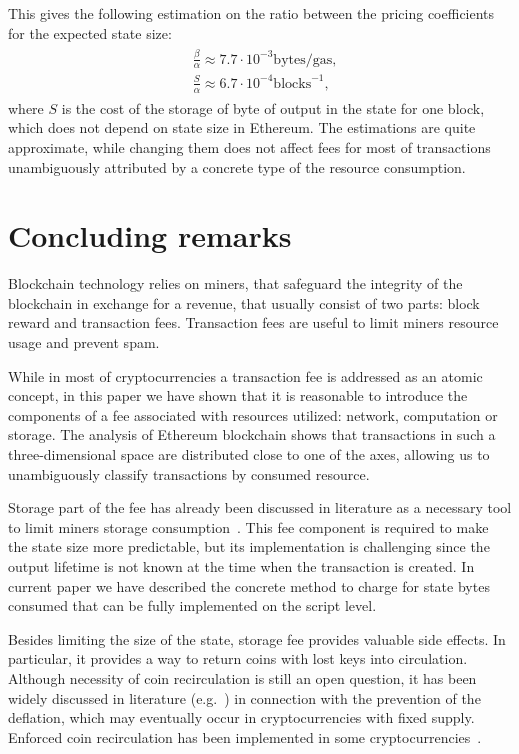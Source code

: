 \documentclass[]{llncs}   %
\begin{document}
This gives the following estimation on the ratio between the pricing coefficients for the expected state size:
\begin{align}
\begin{split}
    &\frac{\beta}{\alpha} \approx 7.7\cdot10^{-3} \mathrm{bytes}/\mathrm{gas},\\
    &\frac{S}{\alpha} \approx 6.7\cdot10^{-4} \mathrm{blocks}^{-1},
\end{split}
\end{align}
where $S$ is the cost of the storage of byte of output in the state for one block, which does
not depend on state size in Ethereum. The estimations are quite approximate, while changing
them does not affect fees for most of transactions unambiguously attributed by a concrete type of the resource consumption.

\section{Concluding remarks}
\label{sec:conslusion}

Blockchain technology relies on miners, that safeguard the integrity of the blockchain
in exchange for a revenue, that usually consist of two parts: block reward and transaction fees.
Transaction fees are useful to limit miners resource usage and prevent spam.

While in most of cryptocurrencies a transaction fee is addressed as an atomic concept,
in this paper we have shown that it is reasonable to introduce the 
components of a fee associated with resources utilized: network, computation or storage.
The analysis of Ethereum blockchain shows that transactions in such a three-dimensional space are
distributed close to one of the axes, allowing us to
unambiguously classify transactions by consumed resource.

Storage part of the fee has already been discussed in literature as a
necessary tool to limit miners storage consumption~\cite{Moeser2015,reyzin2016improving}.
This fee component is required to make the state size more predictable, but its implementation is
challenging since the output lifetime is not known at the time when the transaction is
created. In current paper we have described the concrete method to charge for state bytes consumed
that can be fully implemented on the script level.

Besides limiting the size of the state, storage fee provides valuable side effects.
In particular, it provides a way to return coins with lost keys into circulation.
Although necessity of coin recirculation is still an open question, it
has been widely discussed in literature (e.g.~\cite{gjermundrod2014recirculating,gjermundrod2016going})
in connection with the prevention of the deflation, which may eventually occur in cryptocurrencies with fixed supply. Enforced coin recirculation has been implemented in some cryptocurrencies~\cite{freicoin}.
\end{document}

